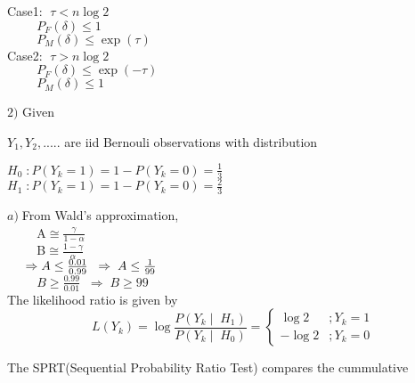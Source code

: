 \documentclass[]{article}
\begin{document}
Case1: $\;\tau<n\log2 $\\

$ \hspace{1cm}P_F(\delta)\leq 1 $ \\

$ \hspace{1cm}P_M(\delta)\leq \exp(\tau) $ \\

 Case2: $\;\tau>n\log2  $\\

$ \hspace{1cm}P_F(\delta)\leq \exp(-\tau) $\\
 
$ \hspace{1cm}P_M(\delta)\leq 1 $ \\
  
\begin{flushleft}
$2)$ Given
\end{flushleft}

$Y_1,Y_2,.....$ are iid Bernouli observations with distribution
\begin{center}
$H_0\;: P(Y_k=1)=1-P(Y_k=0)= \frac{1}{3}$\\
$H_1\;: P(Y_k=1)=1-P(Y_k=0)= \frac{2}{3}$
\end{center}


$a)\;$From Wald's approximation,\\

$\hspace{1cm}$A$\cong\frac{\gamma}{1-\alpha}$\\

$\hspace{1cm}$B$\cong\frac{1-\gamma}{\alpha}$\\

$\hspace{0.5cm}\Rightarrow A\leq\frac{0.01}{0.99} \;\;\Rightarrow\; A\leq\frac{1}{99}$\\

$\hspace{1cm}B\geq\frac{0.99}{0.01} \;\;\Rightarrow\; B\geq99$\\

The likelihood ratio is given by $$\; L(Y_k)= \log\frac{P(Y_k\mid\;H_1)}{P(Y_k\mid\;H_0)} =
\left\{
\begin{array}{lr}
\log2&;Y_k=1 \\
-\log2&;Y_k=0
\end{array}
\right.$$

The SPRT(Sequential Probability Ratio Test) compares the cummulative 
\end{document}
